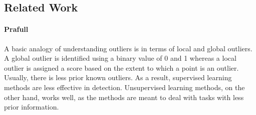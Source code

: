 \documentclass[runningheads]{llncs}
\begin{document}


\subsection{Related Work}


\paragraph{Prafull} A basic analogy of understanding outliers is in terms of local and global outliers. A global outlier is identified using a binary value of 0 and 1 whereas a local outlier is assigned a score based on the extent to which a point is an outlier. Usually, there is less prior known outliers. As a result, supervised learning methods are less effective in detection. Unsupervised learning methods, on the other hand, works well, as the methods are meant to deal with tasks with less prior information.
\end{document}
